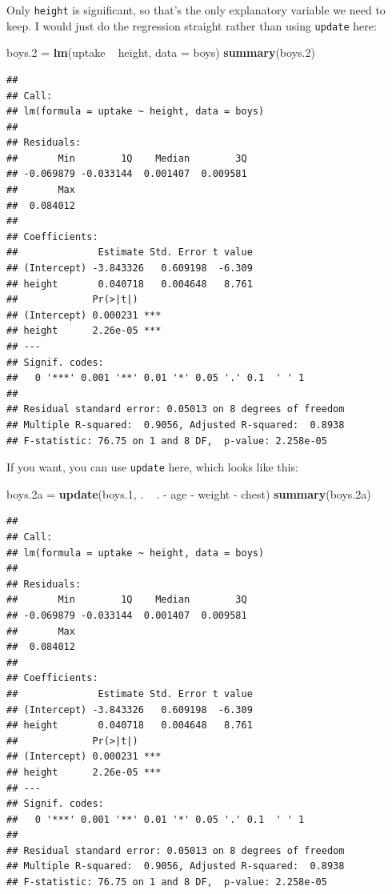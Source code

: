 \documentclass[]{tufte-book}
\newenvironment{Shaded}{}{}
\newcommand{\DataTypeTok}[1]{\textcolor[rgb]{0.56,0.13,0.00}{#1}}
\newcommand{\FloatTok}[1]{\textcolor[rgb]{0.25,0.63,0.44}{#1}}
\newcommand{\KeywordTok}[1]{\textcolor[rgb]{0.00,0.44,0.13}{\textbf{#1}}}
\newcommand{\NormalTok}[1]{#1}
\newcommand{\OperatorTok}[1]{\textcolor[rgb]{0.40,0.40,0.40}{#1}}
\newcommand{\StringTok}[1]{\textcolor[rgb]{0.25,0.44,0.63}{#1}}
\theoremstyle{definition}
\theoremstyle{definition}
\theoremstyle{definition}
\theoremstyle{remark}
\begin{document}
Only \texttt{height} is significant, so that's the only explanatory
variable we need to keep. I would just do the regression straight rather
than using \texttt{update} here:

\begin{Shaded}
\begin{Highlighting}[]
\NormalTok{boys}\FloatTok{.2}\NormalTok{ =}\StringTok{ }\KeywordTok{lm}\NormalTok{(uptake }\OperatorTok{~}\StringTok{ }\NormalTok{height, }\DataTypeTok{data =}\NormalTok{ boys)}
\KeywordTok{summary}\NormalTok{(boys}\FloatTok{.2}\NormalTok{)}
\end{Highlighting}
\end{Shaded}

\begin{verbatim}
## 
## Call:
## lm(formula = uptake ~ height, data = boys)
## 
## Residuals:
##       Min        1Q    Median        3Q 
## -0.069879 -0.033144  0.001407  0.009581 
##       Max 
##  0.084012 
## 
## Coefficients:
##              Estimate Std. Error t value
## (Intercept) -3.843326   0.609198  -6.309
## height       0.040718   0.004648   8.761
##             Pr(>|t|)    
## (Intercept) 0.000231 ***
## height      2.26e-05 ***
## ---
## Signif. codes:  
##   0 '***' 0.001 '**' 0.01 '*' 0.05 '.' 0.1  ' ' 1
## 
## Residual standard error: 0.05013 on 8 degrees of freedom
## Multiple R-squared:  0.9056, Adjusted R-squared:  0.8938 
## F-statistic: 76.75 on 1 and 8 DF,  p-value: 2.258e-05
\end{verbatim}

If you want, you can use \texttt{update} here, which looks like this:

\begin{Shaded}
\begin{Highlighting}[]
\NormalTok{boys}\FloatTok{.2}\NormalTok{a =}\StringTok{ }\KeywordTok{update}\NormalTok{(boys}\FloatTok{.1}\NormalTok{, . }\OperatorTok{~}\StringTok{ }\NormalTok{. }\OperatorTok{-}\StringTok{ }\NormalTok{age }\OperatorTok{-}\StringTok{ }\NormalTok{weight }\OperatorTok{-}\StringTok{ }
\StringTok{    }\NormalTok{chest)}
\KeywordTok{summary}\NormalTok{(boys}\FloatTok{.2}\NormalTok{a)}
\end{Highlighting}
\end{Shaded}

\begin{verbatim}
## 
## Call:
## lm(formula = uptake ~ height, data = boys)
## 
## Residuals:
##       Min        1Q    Median        3Q 
## -0.069879 -0.033144  0.001407  0.009581 
##       Max 
##  0.084012 
## 
## Coefficients:
##              Estimate Std. Error t value
## (Intercept) -3.843326   0.609198  -6.309
## height       0.040718   0.004648   8.761
##             Pr(>|t|)    
## (Intercept) 0.000231 ***
## height      2.26e-05 ***
## ---
## Signif. codes:  
##   0 '***' 0.001 '**' 0.01 '*' 0.05 '.' 0.1  ' ' 1
## 
## Residual standard error: 0.05013 on 8 degrees of freedom
## Multiple R-squared:  0.9056, Adjusted R-squared:  0.8938 
## F-statistic: 76.75 on 1 and 8 DF,  p-value: 2.258e-05
\end{verbatim}
\end{document}

